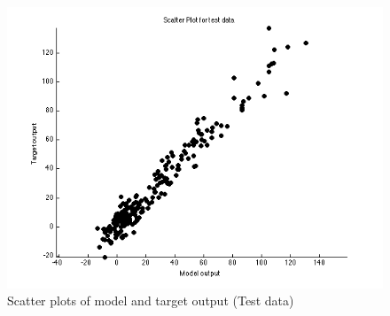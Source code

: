 \documentclass{article}
\begin{document}
\begin{figure}[H]
\centering
\includegraphics[width=0.5\linewidth]{Regression/rbfnn_bivariate/scatter_test.png}
\caption{Scatter plots of model and target output (Test data)}
\end{figure}



%
%
\end{document}
